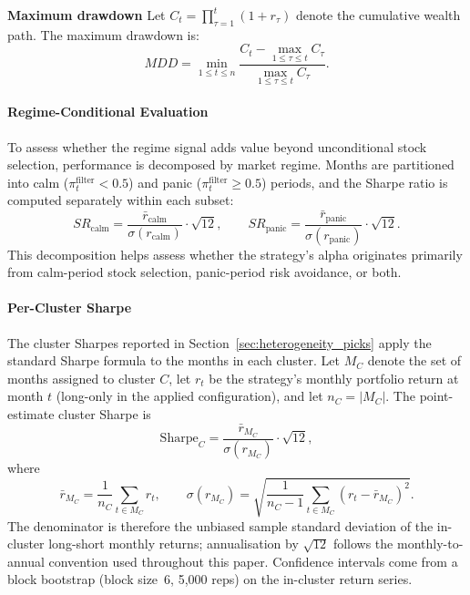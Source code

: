 \textbf{Maximum drawdown} Let $C_t = \prod_{\tau=1}^{t}(1 + r_\tau)$ denote the cumulative wealth path. The maximum drawdown is:
\begin{equation}
    MDD = \min_{1 \leq t \leq n} \frac{C_t - \max_{1 \leq \tau \leq t} C_\tau}{\max_{1 \leq \tau \leq t} C_\tau}.
\end{equation}

\paragraph{Regime-Conditional Evaluation}

To assess whether the regime signal adds value beyond unconditional stock selection, performance is decomposed by market regime. Months are partitioned into calm ($\pi_t^{\text{filter}} < 0.5$) and panic ($\pi_t^{\text{filter}} \geq 0.5$) periods, and the Sharpe ratio is computed separately within each subset:
\begin{equation}
    SR_{\text{calm}} = \frac{\bar{r}_{\text{calm}}}{\sigma(r_{\text{calm}})} \cdot \sqrt{12}, \qquad SR_{\text{panic}} = \frac{\bar{r}_{\text{panic}}}{\sigma(r_{\text{panic}})} \cdot \sqrt{12}.
\end{equation}
This decomposition helps assess whether the strategy's alpha originates primarily from calm-period stock selection, panic-period risk avoidance, or both.

\paragraph{Per-Cluster Sharpe}

The cluster Sharpes reported in Section~\ref{sec:heterogeneity_picks} apply the standard Sharpe formula to the months in each cluster. Let $M_C$ denote the set of months assigned to cluster $C$, let $r_t$ be the strategy's monthly portfolio return at month $t$ (long-only in the applied configuration), and let $n_C = |M_C|$. The point-estimate cluster Sharpe is
\[
\mathrm{Sharpe}_C = \frac{\bar{r}_{M_C}}{\sigma(r_{M_C})} \cdot \sqrt{12},
\]
where
\[
\bar{r}_{M_C} = \frac{1}{n_C} \sum_{t \in M_C} r_t, \qquad \sigma(r_{M_C}) = \sqrt{\frac{1}{n_C - 1} \sum_{t \in M_C} (r_t - \bar{r}_{M_C})^2}.
\]
The denominator is therefore the unbiased sample standard deviation of the in-cluster long-short monthly returns; annualisation by $\sqrt{12}$ follows the monthly-to-annual convention used throughout this paper. Confidence intervals come from a block bootstrap (block size~6, 5{,}000 reps) on the in-cluster return series.

